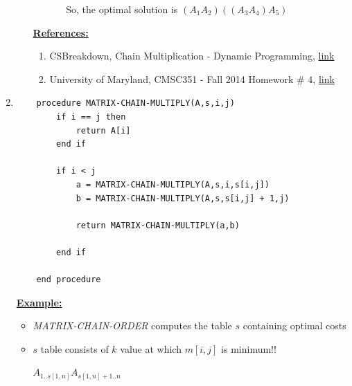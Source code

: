 \documentclass[12pt]{article}
\begin{document}
\begin{enumerate}[1.]
\begin{itemize}
\begin{itemize}
\begin{enumerate}[1.]
                \bigskip

                So, the optimal solution is $(A_1 A_2)((A_3A_4)A_5)$

            \end{enumerate}
        \end{itemize}

        \bigskip

        \underline{\textbf{References:}}

        \bigskip

        \begin{enumerate}[1)]
            \item CSBreakdown, Chain Multiplication - Dynamic Programming, \href{https://www.youtube.com/watch?v=GMzVeWpyTN0}{link}
            \item University of Maryland, CMSC351 - Fall 2014 Homework \# 4, \href{https://www.cs.umd.edu/class/fall2014/cmsc351/HW/hw4-solutions.pdf}{link}
        \end{enumerate}
    \end{itemize}

    \item

    \bigskip

    \begin{lstlisting}
    procedure MATRIX-CHAIN-MULTIPLY(A,s,i,j)
        if i == j then
            return A[i]
        end if

        if i < j
            a = MATRIX-CHAIN-MULTIPLY(A,s,i,s[i,j])
            b = MATRIX-CHAIN-MULTIPLY(A,s,s[i,j] + 1,j)

            return MATRIX-CHAIN-MULTIPLY(a,b)

        end if

    end procedure
    \end{lstlisting}

    \bigskip

    \underline{\textbf{Example:}}

    \bigskip

    \begin{itemize}
        \item \textit{MATRIX-CHAIN-ORDER} computes the table $s$ containing optimal costs
        \item $s$ table consists of $k$ value at which $m[i,j]$ is minimum!!

        \bigskip

        $A_{1..s[1,n]}A_{s[1,n]+1..n}$


\end{itemize}
\end{enumerate}
\end{document}
